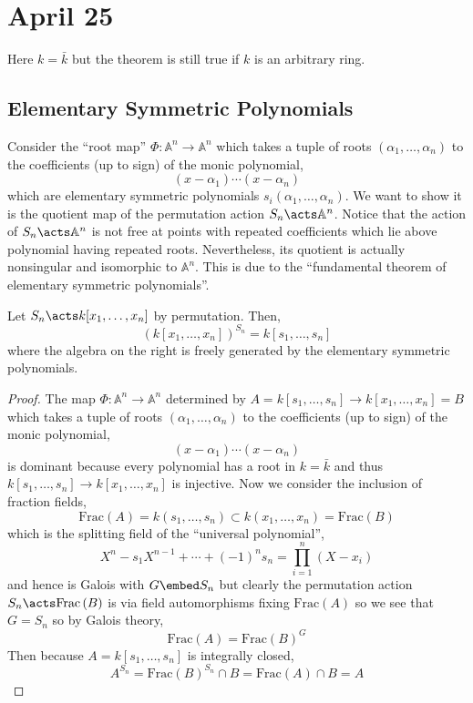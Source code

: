 \documentclass[12pt]{article}
\newcommand{\A}{\mathbb{A}}
\begin{document}
\section{April 25}

\begin{rmk}
Here $k = \bar{k}$ but the theorem is still true if $k$ is an arbitrary ring.
\end{rmk}

\newcommand{\Frac}[1]{\mathrm{Frac}\left( #1 \right)}

\subsection{Elementary Symmetric Polynomials}

Consider the ``root map'' $\Phi : \A^n \to \A^n$ which takes a tuple of roots $(\alpha_1, \dots, \alpha_n)$ to the coefficients (up to sign) of the monic polynomial,
\[ (x - \alpha_1) \cdots (x - \alpha_n) \]
which are elementary symmetric polynomials $s_i(\alpha_1, \dots, \alpha_n)$. We want to show it is the quotient map of the permutation action $S_n \acts \A^n$. Notice that the action of $S_n \acts \A^n$ is not free at points with repeated coefficients which lie above polynomial having repeated roots. Nevertheless, its quotient is actually nonsingular and isomorphic to $\A^n$. This is due to the ``fundamental theorem of elementary symmetric polynomials''. 

\begin{thm}
Let $S_n \acts k[x_1, \dots, x_n]$ by permutation. Then,
\[ (k[x_1, \dots, x_n])^{S_n} = k[s_1, \dots, s_n] \]
where the algebra on the right is freely generated by the elementary symmetric polynomials.
\end{thm}

\begin{proof}
The map $\Phi : \A^n \to \A^n$ determined by $A = k[s_1, \dots, s_n] \to k[x_1, \dots, x_n] = B$ which takes a tuple of roots $(\alpha_1, \dots, \alpha_n)$ to the coefficients (up to sign) of the monic polynomial,
\[ (x - \alpha_1) \cdots (x - \alpha_n) \]
is dominant because every polynomial has a root in $k = \bar{k}$ and thus $k[s_1, \dots, s_n] \to k[x_1, \dots, x_n]$ is injective. Now we consider the inclusion of fraction fields,
\[ \Frac{A} = k(s_1, \dots, s_n) \subset k(x_1, \dots, x_n) = \Frac{B} \]
which is the splitting field of the ``universal polynomial'',
\[ X^n - s_1 X^{n-1} + \cdots + (-1)^n s_n = \prod_{i = 1}^n (X - x_i) \]
and hence is Galois with $G \embed S_n$ but clearly the permutation action $S_n \acts \Frac{B}$ is via field automorphisms fixing $\Frac{A}$ so we see that $G = S_n$ so by Galois theory,
\[ \Frac{A} = \Frac{B}^G \]
Then because $A = k[s_1, \dots, s_n]$ is integrally closed,
\[ A^{S_n} = \Frac{B}^{S_n} \cap B = \Frac{A} \cap B = A \]
\end{proof}
\end{document}
